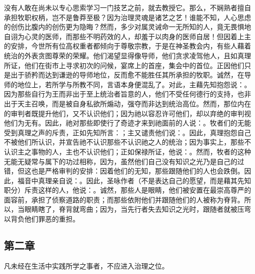 没有人敢在尚未以专心思索学习一门技艺之前，就去教授它。那么，不娴熟者擅自承担牧职权柄，岂不是鲁莽至极？因为治理灵魂是诸艺之艺！谁能不知，人心思虑的创伤比腹内的创伤更为隐晦？然而，多少对属灵诫命一无所知的人，竟无畏惧地自诩为心灵的医师，而那些不明药效的人，却羞于以肉身的医师自居！但因着上主的安排，今世所有位高权重者都倾向于尊敬宗教，于是在神圣教会内，有些人藉着统治的外表贪图尊荣的荣耀。他们渴望显得像导师，他们贪求凌驾他人，且如真理所证，他们在街市上寻求初次的问候，宴席上的首座，集会中的首位。正因他们只是出于骄矜而达到谦逊的导师地位，反而愈不能胜任其所承担的牧职。诚然，在导师的地位上，若所学与所教不同，言语本身便混乱了。对此，主藉先知抱怨说：。因为那些自行为王而非出于至上统治者旨意的人，他们不受任何德行的支持，也非出于天主召唤，而是被自身私欲所煽动，强夺而非达到统治高位。然而，那位内在的审判者既提升他们，又不认识他们；因为祂以容忍许可他们，却以弃绝的审判视他们为无有。因此，祂对那些即使行了奇迹才来到祂面前的人说：。牧者们的无能受到真理之声的斥责，正如先知所言：；主又谴责他们说：。因此，真理抱怨自己不被他们所认识，并宣告祂不认识那些不认识祂之人的统治；因为事实上，那些不认识主之事物的人，主也不认识他们；正如保禄所证，他说：。然而，牧者的这种无能无疑常与属下的功过相称，因为，虽然他们自己没有知识之光乃是自己的过错，但这也是严格审判的安排：因着他们的无知，那些跟随他们的人也会跌倒。因此，福音中真理亲自说：。因此，圣咏作者（不是表达自己的愿望，而是藉其先知职分）斥责这样的人，他说：。诚然，那些人是眼睛，他们被安置在最崇高尊严的面容前，承担了侦察道路的职责；而那些依附他们并跟随他们的人被称为脊背。所以，当眼睛瞎了，脊背就弯曲；因为，当先行者失去知识之光时，跟随者就被压弯以背负他们罪恶的重担。\par


\subsection{第二章}

凡未经在生活中实践所学之事者，不应进入治理之位。\par


